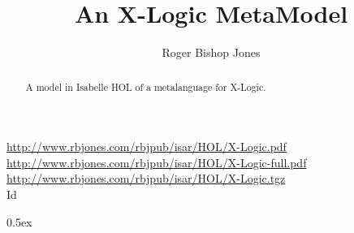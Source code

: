 \documentclass[11pt,a4paper]{article}
\begin{document}
\title{An X-Logic MetaModel}
\author{Roger Bishop Jones}
\maketitle

\begin{abstract}
A model in Isabelle HOL of a metalanguage for X-Logic.
\end{abstract}

\vfill

\begin{centering}
{\tiny
\href{http://www.rbjones.com/rbjpub/isar/HOL/X-Logic.pdf}{http://www.rbjones.com/rbjpub/isar/HOL/X-Logic.pdf}\\
\href{http://www.rbjones.com/rbjpub/isar/HOL/X-Logic-full.pdf}{http://www.rbjones.com/rbjpub/isar/HOL/X-Logic-full.pdf}\\
\href{http://www.rbjones.com/rbjpub/isar/HOL/X-Logic.tgz}{http://www.rbjones.com/rbjpub/isar/HOL/X-Logic.tgz}\\
$ $Id $ $
}%
\end{centering}

\newpage
\tableofcontents

\parindent 0pt\parskip 0.5ex



%
%
\end{document}
